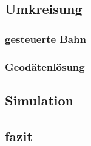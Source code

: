 \begin{refsection}
	\section{Umkreisung}
	
	
	
	\subsubsection{gesteuerte Bahn}
	
	
	\subsubsection{Geodätenlösung}
	
	
	\subsection{Simulation}
	
	
	\subsection{fazit}
	
	
	


	\printbibliography[heading=subbibliography]
	\end{refsection}

